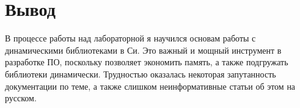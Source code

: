 \section{Вывод}

В процессе работы над лабораторной я научился основам работы с динамическими библиотеками в Си. Это важный и мощный инструмент в разработке ПО, поскольку позволяет экономить память, а также подгружать библиотеки динамически. Трудностью оказалась некоторая запутанность документации по теме, а также слишком неинформативные статьи об этом на русском.


